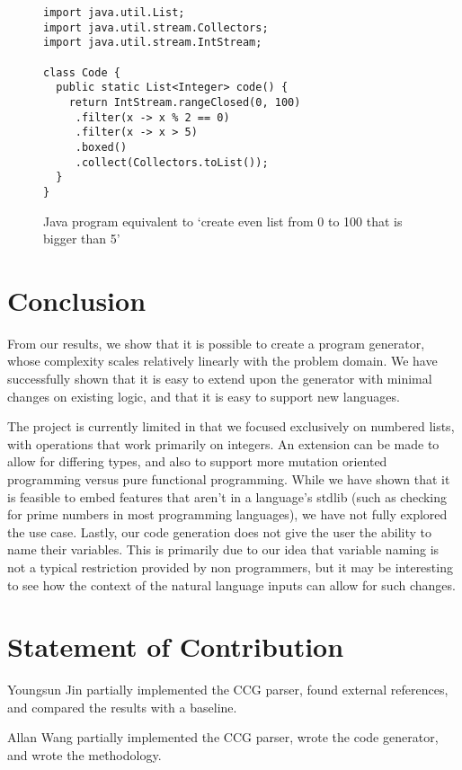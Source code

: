 \documentclass[11pt,letterpaper]{article}
\begin{document}
\begin{figure}
  \small
  \begin{verbatim}
import java.util.List;
import java.util.stream.Collectors;
import java.util.stream.IntStream;

class Code {
  public static List<Integer> code() {
    return IntStream.rangeClosed(0, 100)
     .filter(x -> x % 2 == 0)
     .filter(x -> x > 5)
     .boxed()
     .collect(Collectors.toList());
  }
}
  \end{verbatim}
  \caption{Java program equivalent to `create even list from 0 to 100 that is bigger than 5'}
\end{figure}

\section{Conclusion}

From our results, we show that it is possible to create a program generator, whose complexity scales relatively linearly with the problem domain.
We have successfully shown that it is easy to extend upon the generator with minimal changes on existing logic, and that it is easy to support new languages.

The project is currently limited in that we focused exclusively on numbered lists, with operations that work primarily on integers.
An extension can be made to allow for differing types, and also to support more mutation oriented programming versus pure functional programming.
While we have shown that it is feasible to embed features that aren't in a language's stdlib (such as checking for prime numbers in most programming languages), we have not fully explored the use case.
Lastly, our code generation does not give the user the ability to name their variables. 
This is primarily due to our idea that variable naming is not a typical restriction provided by non programmers, but it may be interesting to see how the context of the natural language inputs can allow for such changes.

\nocite{*}



\section{Statement of Contribution}

Youngsun Jin partially implemented the CCG parser, found external references, and compared the results with a baseline.

Allan Wang partially implemented the CCG parser, wrote the code generator, and wrote the methodology.
\end{document}
